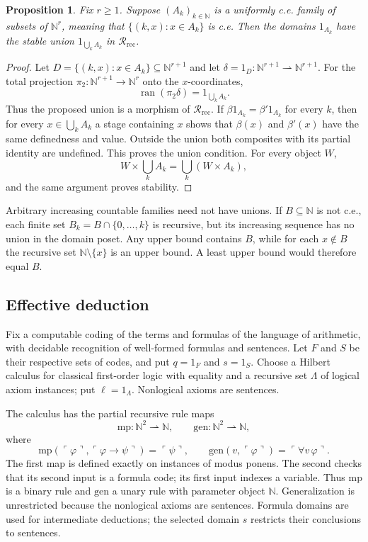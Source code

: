 \documentclass[11pt]{article}
\newtheorem{proposition}[theorem]{Proposition}
\theoremstyle{definition}
\newcommand{\R}{\mathscr R}
\newcommand{\ran}{\operatorname{ran}}
\begin{document}
\begin{proposition}\label{prop:effective-union}
Fix $r\ge1$. Suppose $(A_k)_{k\in\mathbb N}$ is a uniformly c.e. family of
subsets of $\mathbb N^r$, meaning that
$\{(k,x):x\in A_k\}$ is c.e. Then the domains $1_{A_k}$ have the stable
union $1_{\bigcup_k A_k}$ in $\R_{\mathrm{rec}}$.
\end{proposition}
\begin{proof}
Let $D=\{(k,x):x\in A_k\}\subseteq\mathbb N^{r+1}$ and let
$\delta=1_D:\mathbb N^{r+1}\rightharpoonup\mathbb N^{r+1}$. For the total
projection $\pi_2:\mathbb N^{r+1}\to\mathbb N^r$ onto the $x$-coordinates,
\[
 \ran(\pi_2\delta)=1_{\bigcup_k A_k}.
\]
Thus the proposed union is a morphism of $\R_{\mathrm{rec}}$.
If $\beta1_{A_k}=\beta'1_{A_k}$ for every $k$, then for every
$x\in\bigcup_k A_k$ a stage containing $x$ shows that $\beta(x)$ and
$\beta'(x)$ have the same definedness and value. Outside the union both
composites with its partial identity are undefined. This proves the union
condition. For every object $W$,
\[
 W\times\bigcup_k A_k=\bigcup_k(W\times A_k),
\]
and the same argument proves stability.
\end{proof}

Arbitrary increasing countable families need not have unions. If
$B\subseteq\mathbb N$ is not c.e., each finite set
$B_k=B\cap\{0,\ldots,k\}$ is recursive, but its increasing sequence has no
union in the domain poset. Any upper bound contains $B$, while for each
$x\notin B$ the recursive set $\mathbb N\setminus\{x\}$ is an upper bound.
A least upper bound would therefore equal $B$.

\subsection{Effective deduction}

Fix a computable coding of the terms and formulas of the language of
arithmetic, with decidable recognition of well-formed formulas and sentences.
Let $F$ and $S$ be their respective sets of codes, and put $q=1_F$ and
$s=1_S$. Choose a Hilbert calculus for classical first-order logic with
equality and a recursive set $\Lambda$ of logical axiom instances; put
$\ell=1_\Lambda$. Nonlogical axioms are sentences.

The calculus has the partial recursive rule maps
\[
 \mathrm{mp}:\mathbb N^2\rightharpoonup\mathbb N,
 \qquad \mathrm{gen}:\mathbb N^2\rightharpoonup\mathbb N,
\]
where
\[
 \mathrm{mp}(\ulcorner\varphi\urcorner,\ulcorner\varphi\to\psi\urcorner)
 =\ulcorner\psi\urcorner,
 \qquad
 \mathrm{gen}(v,\ulcorner\varphi\urcorner)=\ulcorner\forall v\,\varphi\urcorner.
\]
The first map is defined exactly on instances of modus ponens. The second
checks that its second input is a formula code; its first input indexes a
variable. Thus $\mathrm{mp}$ is a binary rule and $\mathrm{gen}$ a unary rule with parameter
object $\mathbb N$. Generalization is unrestricted because the nonlogical
axioms are sentences. Formula domains are used for intermediate deductions;
the selected domain $s$ restricts their conclusions to sentences.
\end{document}
